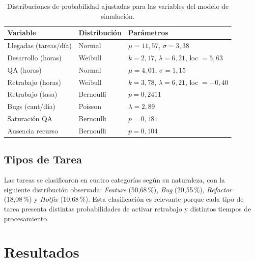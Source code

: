 \documentclass[12pt]{article}
\begin{document}
\begin{table}[H]
  \centering
  \caption{Distribuciones de probabilidad ajustadas para las
           variables del modelo de simulación.}
  \label{tab:distribuciones}
  \begin{tabular}{lll}
    \toprule
    \textbf{Variable} & \textbf{Distribución} & \textbf{Parámetros} \\
    \midrule
    Llegadas (tareas/día) & Normal   & $\mu = 11{,}57$, $\sigma = 3{,}38$   \\
    Desarrollo (horas)    & Weibull  & $k = 2{,}17$, $\lambda = 6{,}21$,
                                         loc $= 5{,}63$                     \\
    QA (horas)            & Normal   & $\mu = 4{,}01$, $\sigma = 1{,}15$   \\
    Retrabajo (horas)     & Weibull  & $k = 3{,}78$, $\lambda = 6{,}21$,
                                         loc $= -0{,}40$                    \\
    Retrabajo (tasa)      & Bernoulli & $p = 0{,}2411$                      \\
    Bugs (cant/día)       & Poisson  & $\lambda = 2{,}89$                  \\
    Saturación QA         & Bernoulli & $p = 0{,}181$                       \\
    Ausencia recurso      & Bernoulli & $p = 0{,}104$                       \\
    \bottomrule
  \end{tabular}
\end{table}

\subsection{Tipos de Tarea}

Las tareas se clasificaron en cuatro categorías según su naturaleza,
con la siguiente distribución observada: \textit{Feature}
(50{,}68\,\%), \textit{Bug} (20{,}55\,\%), \textit{Refactor}
(18{,}08\,\%) y \textit{Hotfix} (10{,}68\,\%). Esta clasificación es
relevante porque cada tipo de tarea presenta distintas probabilidades
de activar retrabajo y distintos tiempos de procesamiento.

\section{Resultados}
\end{document}
